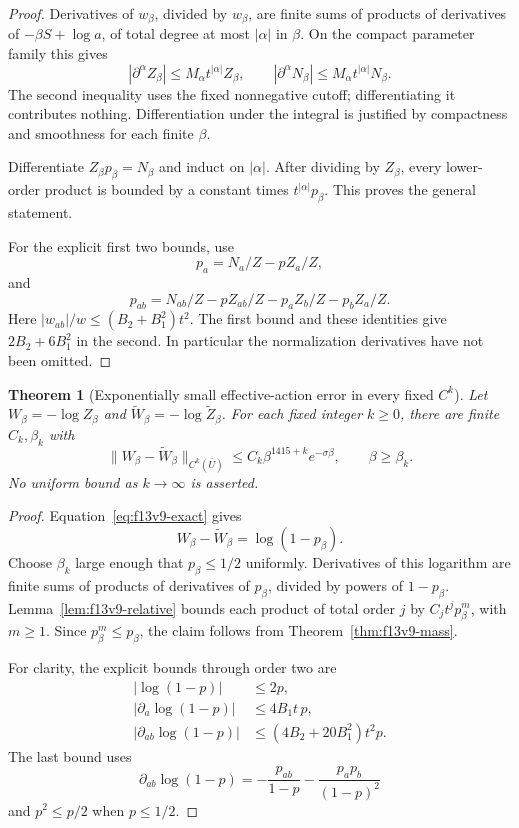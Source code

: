 \documentclass[11pt,oneside]{article}
\newtheorem{theorem}{Theorem}[section]
\begin{document}
\begin{proof}
Derivatives of \(w_\beta\), divided
by \(w_\beta\), are finite sums of
products of derivatives of
\(-\beta S+\log a\), of total degree
at most \(|\alpha|\) in \(\beta\).
On the compact parameter family this
gives
\[
 |\partial^\alpha Z_\beta|
 \le M_\alpha t^{|\alpha|}Z_\beta,\qquad
 |\partial^\alpha N_\beta|
 \le M_\alpha t^{|\alpha|}N_\beta .
\]
The second inequality uses the fixed
nonnegative cutoff; differentiating
it contributes nothing. Differentiation
under the integral is justified by
compactness and smoothness for each
finite \(\beta\).

Differentiate \(Z_\beta p_\beta=N_\beta\)
and induct on \(|\alpha|\).
After dividing by \(Z_\beta\), every
lower-order product is bounded by
a constant times \(t^{|\alpha|}p_\beta\).
This proves the general statement.

For the explicit first two bounds,
use
\[
 p_a=N_a/Z-pZ_a/Z,
\]
and
\[
 p_{ab}=N_{ab}/Z-pZ_{ab}/Z
                     -p_aZ_b/Z-p_bZ_a/Z .
\]
Here
\(|w_{ab}|/w\le(B_2+B_1^2)t^2\).
The first bound and these identities
give \(2B_2+6B_1^2\) in the second.
In particular the normalization
derivatives have not been omitted.
\end{proof}

\begin{theorem}[Exponentially small effective-action error in every fixed \(C^k\)]
\label{thm:f13v9-potential}
Let
\(W_\beta=-\log Z_\beta\) and
\(\widetilde W_\beta=-\log\widetilde Z_\beta\).
For each fixed integer \(k\ge0\),
there are finite \(C_k,\beta_k\) with
\[
 \|W_\beta-\widetilde W_\beta\|_{C^k(\overline U)}
 \le C_k\beta^{1415+k}e^{-\sigma\beta},
 \qquad\beta\ge\beta_k .
\]
No uniform bound as \(k\to\infty\)
is asserted.
\end{theorem}

\begin{proof}
Equation~\eqref{eq:f13v9-exact} gives
\[
 W_\beta-\widetilde W_\beta
                         =\log(1-p_\beta).
\]
Choose \(\beta_k\) large enough that
\(p_\beta\le1/2\) uniformly. Derivatives
of this logarithm are finite sums
of products of derivatives of \(p_\beta\),
divided by powers of \(1-p_\beta\).
Lemma~\ref{lem:f13v9-relative} bounds
each product of total order \(j\)
by \(C_jt^jp_\beta^m\), with \(m\ge1\).
Since \(p_\beta^m\le p_\beta\), the
claim follows from
Theorem~\ref{thm:f13v9-mass}.

For clarity, the explicit bounds
through order two are
\begin{align*}
 |\log(1-p)|&\le2p,\\
 |\partial_a\log(1-p)|&\le4B_1t\,p,\\
 |\partial_{ab}\log(1-p)|
                  &\le(4B_2+20B_1^2)t^2p .
\end{align*}
The last bound uses
\[
 \partial_{ab}\log(1-p)
 =-\frac{p_{ab}}{1-p}-\frac{p_ap_b}{(1-p)^2}
\]
and \(p^2\le p/2\) when \(p\le1/2\).
\end{proof}
\end{document}
